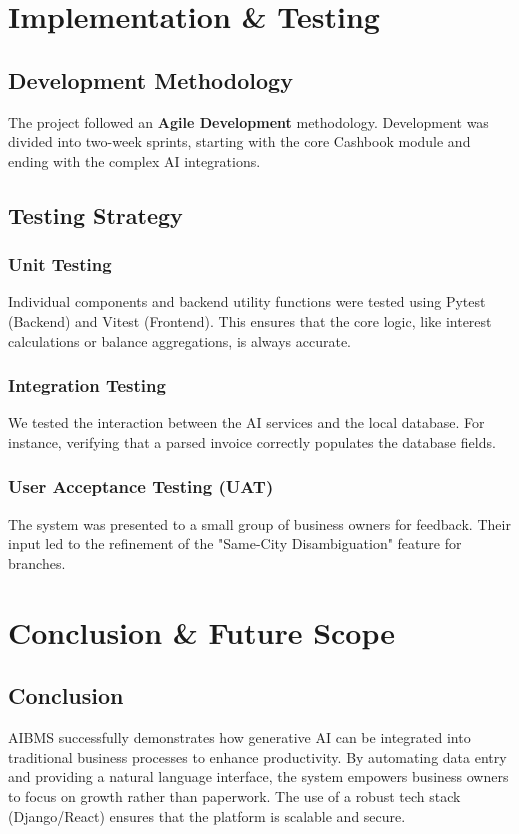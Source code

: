 \documentclass[12pt,a4paper]{report}
\begin{document}
\chapter{Implementation \& Testing}
\section{Development Methodology}
The project followed an \textbf{Agile Development} methodology. Development was divided into two-week sprints, starting with the core Cashbook module and ending with the complex AI integrations.

\section{Testing Strategy}
\subsection{Unit Testing}
Individual components and backend utility functions were tested using Pytest (Backend) and Vitest (Frontend). This ensures that the core logic, like interest calculations or balance aggregations, is always accurate.

\subsection{Integration Testing}
We tested the interaction between the AI services and the local database. For instance, verifying that a parsed invoice correctly populates the database fields.

\subsection{User Acceptance Testing (UAT)}
The system was presented to a small group of business owners for feedback. Their input led to the refinement of the "Same-City Disambiguation" feature for branches.

\chapter{Conclusion \& Future Scope}
\section{Conclusion}
AIBMS successfully demonstrates how generative AI can be integrated into traditional business processes to enhance productivity. By automating data entry and providing a natural language interface, the system empowers business owners to focus on growth rather than paperwork. The use of a robust tech stack (Django/React) ensures that the platform is scalable and secure.
\end{document}
